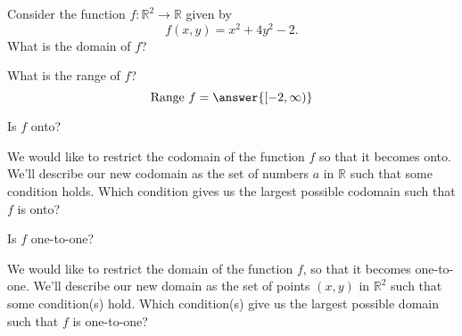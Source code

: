 \begin{problem}
Consider the function $f:\mathbb{R}^2\rightarrow\mathbb{R}$ given by
\[
f(x,y) = x^2+4y^2 -2.
\]
What is the domain of $f$?
\begin{multipleChoice}
\choice{$[0,\infty)$}
\end{multipleChoice}

What is the range of $f$?
\[
\textrm{Range }f = \answer{[-2,\infty)}
\]

Is $f$ onto?
\begin{multipleChoice}
\end{multipleChoice}

\begin{problem}
We would like to restrict the codomain of the function $f$ so that it becomes onto. We'll describe our new codomain as the set of numbers $a$ in $\mathbb{R}$ such that some condition holds. Which condition gives us the largest possible codomain such that $f$ is onto?
\begin{multipleChoice}
\end{multipleChoice}
\end{problem}

Is $f$ one-to-one?
\begin{multipleChoice}
\end{multipleChoice}

\begin{problem}
We would like to restrict the domain of the function $f$, so that it becomes one-to-one. We'll describe our new domain as the set of points $(x,y)$ in $\mathbb{R}^2$ such that some condition(s) hold. Which condition(s) give us the largest possible domain such that $f$ is one-to-one?
\begin{selectAll}
\end{selectAll}
\end{problem}
\end{problem}
